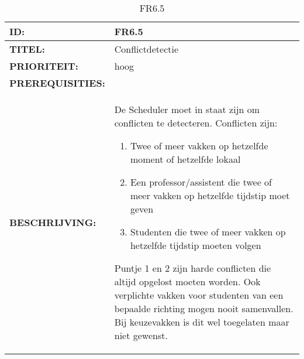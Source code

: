 \noindent\begin{table}[h]
            \begin{tabular}{l | p{10cm}}
                \textbf{ID:} & FR6.5 \\ \hline
                \textbf{TITEL:} & Conflictdetectie\\ \hline
                \textbf{PRIORITEIT:} & hoog \\ \hline
                \textbf{PREREQUISITIES:} & \\ \hline
                \textbf{BESCHRIJVING:} & De Scheduler moet in staat zijn om conflicten te detecteren. Conflicten zijn: 
                \begin{enumerate}
                \item Twee of meer vakken op hetzelfde moment of hetzelfde lokaal
                \item Een professor/assistent  die twee of meer vakken op hetzelfde tijdstip moet geven 
                \item Studenten die twee of meer vakken op hetzelfde tijdstip moeten volgen
                \end{enumerate}
                Puntje 1 en 2 zijn harde conflicten die altijd opgelost moeten worden. Ook verplichte vakken voor studenten van een bepaalde richting mogen nooit samenvallen. Bij keuzevakken is dit wel toegelaten maar niet gewenst.\\
            \end{tabular}\\
            \caption{FR6.5}
            \label{tab:FR6.5}
        \end{table}
        